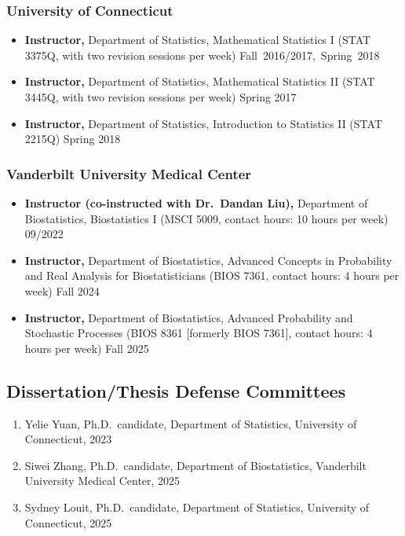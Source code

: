 \documentclass[12pt]{article}
\begin{document}
	\subsubsection*{University of Connecticut}
	\begin{itemize}
		\item {\bf Instructor,} Department of Statistics, Mathematical 
		Statistics {\rm I} (STAT 3375Q, with two revision sessions per week) 
		\hfill 
		\mbox{Fall 2016/2017, Spring 2018}
		\item {\bf Instructor,} Department of Statistics, Mathematical 
		Statistics {\rm II} (STAT 3445Q, with two revision sessions per week) 
		\hfill Spring 2017
		\item {\bf Instructor,} Department of Statistics, Introduction to 
		Statistics {\rm II} (STAT 2215Q) \hfill Spring 2018
	\end{itemize}
	
	\subsubsection*{Vanderbilt University Medical Center}
	\begin{itemize}
		\item {\bf Instructor (co-instructed with Dr.\ Dandan Liu),} Department 
		of Biostatistics, Biostatistics {\rm I} (MSCI 5009, contact hours: 10 
		hours per week) \hfill 09/2022
		\item {\bf Instructor,} Department of Biostatistics, 
		Advanced Concepts in Probability and Real Analysis for 
		Biostatisticians (BIOS 7361, contact hours: 4 hours per 
		week) \hfill Fall 2024
		\item {\bf Instructor,} Department of Biostatistics, 
		Advanced Probability and Stochastic Processes (BIOS 8361 
		[formerly BIOS 7361], contact hours: 4 hours per week) 
		\hfill Fall 2025
	\end{itemize}
	
	\subsection*{Dissertation/Thesis Defense Committees}
	\begin{enumerate}
		\item Yelie Yuan, Ph.D.\ candidate, Department of 
		Statistics, University of Connecticut, 2023
		\item Siwei Zhang, Ph.D.\ candidate, Department of 
		Biostatistics, Vanderbilt University Medical Center, 2025 
		\item Sydney Louit, Ph.D.\ candidate, Department of 
		Statistics, University of Connecticut, 2025
	\end{enumerate}
	
\end{document}
